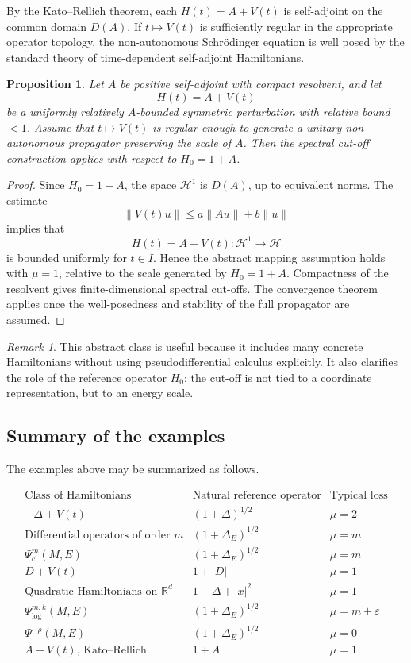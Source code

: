 \documentclass[11pt]{amsart}
\theoremstyle{plain}
\newtheorem{proposition}[theorem]{Proposition}
\theoremstyle{definition}
\theoremstyle{remark}
\newtheorem{remark}[theorem]{Remark}
\newcommand{\Hilb}{\mathcal H}
\begin{document}
By the Kato--Rellich theorem, each \(H(t)=A+V(t)\) is self-adjoint on
the common domain \(D(A)\).  If \(t\mapsto V(t)\) is sufficiently
regular in the appropriate operator topology, the non-autonomous
Schr\"odinger equation is well posed by the standard theory of
time-dependent self-adjoint Hamiltonians.

\begin{proposition}
Let \(A\) be positive self-adjoint with compact resolvent, and let
\[
        H(t)=A+V(t)
\]
be a uniformly relatively \(A\)-bounded symmetric perturbation with
relative bound \(<1\).  Assume that \(t\mapsto V(t)\) is regular enough
to generate a unitary non-autonomous propagator preserving the scale of
\(A\).  Then the spectral cut-off construction applies with respect to
\(H_0=1+A\).
\end{proposition}

\begin{proof}
Since \(H_0=1+A\), the space \(\Hilb^1\) is \(D(A)\), up to equivalent
norms.  The estimate
\[
        \|V(t)u\|
        \leq
        a\|Au\|+b\|u\|
\]
implies that
\[
        H(t)=A+V(t):\Hilb^1\to\Hilb
\]
is bounded uniformly for \(t\in I\).  Hence the abstract mapping
assumption holds with \(\mu=1\), relative to the scale generated by
\(H_0=1+A\).  Compactness of the resolvent gives finite-dimensional
spectral cut-offs.  The convergence theorem applies once the
well-posedness and stability of the full propagator are assumed.
\end{proof}

\begin{remark}
This abstract class is useful because it includes many concrete
Hamiltonians without using pseudodifferential calculus explicitly.  It
also clarifies the role of the reference operator \(H_0\): the cut-off
is not tied to a coordinate representation, but to an energy scale.
\end{remark}

\subsection{Summary of the examples}

The examples above may be summarized as follows.

\[
\begin{array}{c|c|c}
\text{Class of Hamiltonians}
&
\text{Natural reference operator}
&
\text{Typical loss}
\\ \hline
-\Delta+V(t)
&
(1+\Delta)^{1/2}
&
\mu=2
\\
\text{Differential operators of order }m
&
(1+\Delta_E)^{1/2}
&
\mu=m
\\
\Psi_{\mathrm{cl}}^m(M,E)
&
(1+\Delta_E)^{1/2}
&
\mu=m
\\
D+V(t)
&
1+|D|
&
\mu=1
\\
\text{Quadratic Hamiltonians on }\mathbb R^d
&
1-\Delta+|x|^2
&
\mu=1
\\
\Psi_{\log}^{m,k}(M,E)
&
(1+\Delta_E)^{1/2}
&
\mu=m+\varepsilon
\\
\Psi^{-\rho}(M,E)
&
(1+\Delta_E)^{1/2}
&
\mu=0
\\
A+V(t)\text{, Kato--Rellich}
&
1+A
&
\mu=1
\end{array}
\]
\end{document}
